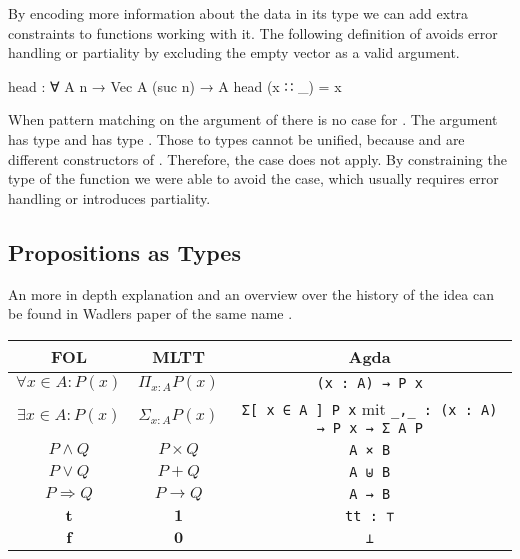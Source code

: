 \documentclass[10pt,a4paper,twoside]{report}
\begin{document}
By encoding more information about the data in its type we can add extra
constraints to functions working with it.
The following definition of  avoids error handling or
partiality by excluding the empty vector as a valid argument.

\begin{code}
head : ∀ {A n} → Vec A (suc n) → A
head (x ∷ _) = x
\end{code}
When pattern matching on the argument of  there is no case
for \AgdaInductiveConstructor{[]}.
The argument has type  and
\AgdaInductiveConstructor{[]} has type .
Those to types cannot be unified, because  and
 are different constructors of .
Therefore, the \AgdaInductiveConstructor{[]} case does not apply.
By constraining the type of the function we were able to avoid the case, which
usually requires error handling or introduces partiality.

\subsection{Propositions as Types}

An more in depth explanation and an overview over the history of the idea can be
found in Wadlers paper of the same name \cite{DBLP:journals/cacm/Wadler15}.

\begin{center}
  \begin{tabular}{ccc}
    FOL & MLTT & Agda \\\hline
    $\forall x \in A: P(x)$ & $\Pi_{x:A}P(x)$ & \texttt{(x : A) → P x} \\
    $\exists x \in A: P(x)$ & $\Sigma_{x:A} P(x)$ & \texttt{Σ[ x ∈ A ] P x} mit \texttt{_,_ : (x : A) → P x → Σ A P} \\
    $P \wedge Q$ & $P \times Q$ & \texttt{A × B} \\
    $P \vee Q$ & $P + Q$ & \texttt{A ⊎ B} \\
    $P \Rightarrow Q$ & $P \rightarrow Q$ & \texttt{A → B} \\
    $\mathbf t$ & $\mathbf 1$ & \texttt{tt : ⊤} \\
    $\mathbf f$ & $\mathbf 0$ & \texttt{⊥}
  \end{tabular}
\end{center}
\end{document}
